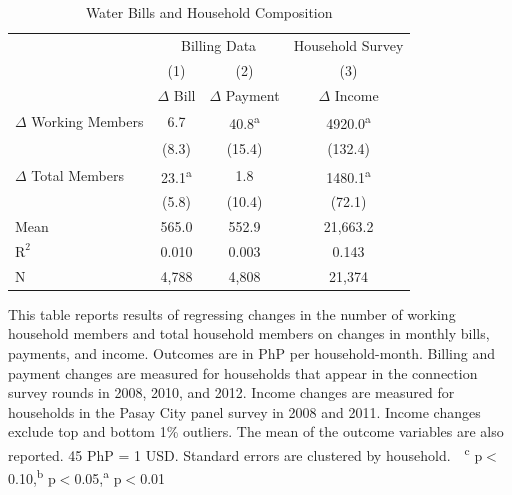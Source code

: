 \documentclass[12pt]{article}
\begin{document}
\begin{table}[!ht]
\small
\centering
\begin{threeparttable}
\caption{Water Bills and Household Composition}\label{table:panelanalysis}
\vspace{-2mm}
\begin{tabular}{@{}lccc@{}}
\toprule
 & \multicolumn{2}{c}{Billing Data} & Household Survey \\
 & \small (1) & \small (2) & \small (3)  \\
 & \small $\Delta$ Bill & \small $\Delta$ Payment & \small $\Delta$ Income \\[.5em]
 \toprule
$\Delta$ Working Members&         6.7                   &        40.8\textsuperscript{a}&      4920.0\textsuperscript{a}\\
                    &       (8.3)                   &      (15.4)                   &     (132.4)                   \\[0.5em]
$\Delta$ Total Members&        23.1\textsuperscript{a}&         1.8                   &      1480.1\textsuperscript{a}\\
                    &       (5.8)                   &      (10.4)                   &      (72.1)                   \\[0.5em]
Mean                &       565.0                   &       552.9                   &    21,663.2                   \\
$\text{R}^{2}$      &       0.010                   &       0.003                   &       0.143                   \\
N                   &       4,788                   &       4,808                   &      21,374                   \\
\bottomrule
\end{tabular}
\begin{tablenotes}
\footnotesize
\item 
This table reports results of regressing changes in the number of working household members and total household members on changes in monthly bills, payments, and income.  Outcomes are in PhP per household-month.  Billing and payment changes are measured for households that appear in the connection survey rounds in 2008, 2010, and 2012.  Income changes are measured for households in the Pasay City panel survey in 2008 and 2011.  Income changes exclude top and bottom 1\% outliers.  The mean of the outcome variables are also reported. 45 PhP = 1 USD.  Standard errors are clustered by household.  \,\, \textsuperscript{c} p$<$0.10,\textsuperscript{b} p$<$0.05,\textsuperscript{a} p$<$0.01 
\end{tablenotes}
\end{threeparttable}
\end{table}
\end{document}

